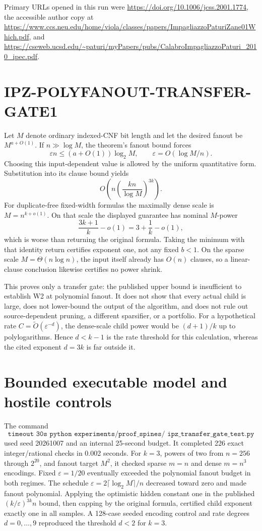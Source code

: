 \documentclass[11pt]{article}
\begin{document}
Primary URLs opened in this run were
\url{https://doi.org/10.1006/jcss.2001.1774}, the accessible author copy at
\url{https://www.ccs.neu.edu/home/viola/classes/papers/ImpagliazzoPaturiZane01Which.pdf},
and
\url{https://cseweb.ucsd.edu/~paturi/myPapers/pubs/CalabroImpagliazzoPaturi_2010_ipec.pdf}.

\section{IPZ-POLYFANOUT-TRANSFER-GATE1}
Let $M$ denote ordinary indexed-CNF bit length and let the desired fanout be
$M^{a+O(1)}$.  If $n\gg\log M$, the theorem's fanout bound forces
\[
 \varepsilon n\le (a+O(1))\log_2M,
 \qquad
 \varepsilon=O(\!\log M/n).
\]
Choosing this input-dependent value is allowed by the uniform quantitative
form.  Substitution into its clause bound yields
\[
 O\!\left(n\left(\frac{kn}{\log M}\right)^{3k}\right).
\]
For duplicate-free fixed-width formulas the maximally dense scale is
$M=n^{k+o(1)}$.  On that scale the displayed guarantee has nominal
$M$-power
\[
 \frac{3k+1}{k}-o(1)=3+\frac1k-o(1),
\]
which is worse than returning the original formula.  Taking the minimum with
that identity return certifies exponent one, not any fixed $b<1$.  On the
sparse scale $M=\Theta(n\log n)$, the input itself already has $O(n)$ clauses,
so a linear-clause conclusion likewise certifies no power shrink.

This proves only a transfer gate: the published upper bound is insufficient
to establish W2 at polynomial fanout.  It does not show that every actual
child is large, does not lower-bound the output of the algorithm, and does not
rule out source-dependent pruning, a different sparsifier, or a portfolio.
For a hypothetical rate $C=\widetilde O(\varepsilon^{-d})$, the dense-scale
child power would be $(d+1)/k$ up to polylogarithms.  Hence $d<k-1$ is the
rate threshold for this calculation, whereas the cited exponent $d=3k$ is
far outside it.

\section{Bounded executable model and hostile controls}
The command
\[
\texttt{timeout 30s python experiments/proof\_spines/
ipz\_transfer\_gate\_test.py}
\]
used seed 20261007 and an internal 25-second budget.  It completed 226 exact
integer/rational checks in 0.002 seconds.  For $k=3$, powers of two from
$n=256$ through $2^{20}$, and fanout target $M^2$, it checked sparse
$m=n$ and dense $m=n^3$ encodings.  Fixed $\varepsilon=1/20$ eventually
exceeded the polynomial fanout budget in both regimes.  The schedule
$\varepsilon=2\lceil\log_2M\rceil/n$ decreased toward zero and made fanout
polynomial.  Applying the optimistic hidden constant one in the published
$(k/\varepsilon)^{3k}n$ bound, then capping by the original formula, certified
child exponent exactly one in all samples.  A 128-case seeded encoding control
and rate degrees $d=0,\ldots,9$ reproduced the threshold $d<2$ for $k=3$.
\end{document}
